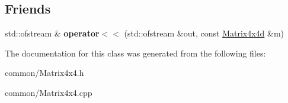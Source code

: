 \subsection*{Friends}
\begin{DoxyCompactItemize}
\item 
\mbox{\label{class_matrix4x4d_a95e0e03428f4cf3315e0666ed529cb27}} 
std\+::ofstream \& {\bfseries operator$<$$<$} (std\+::ofstream \&out, const \mbox{\hyperlink{class_matrix4x4d}{Matrix4x4d}} \&m)
\end{DoxyCompactItemize}


The documentation for this class was generated from the following files\+:\begin{DoxyCompactItemize}
\item 
common/Matrix4x4.\+h\item 
common/Matrix4x4.\+cpp\end{DoxyCompactItemize}
